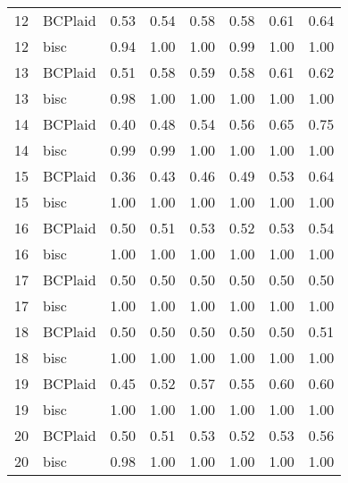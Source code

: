 \begin{table}[ht]
\begin{tabular}{rlrrrrrr}
   12 & BCPlaid & 0.53 & 0.54 & 0.58 & 0.58 & 0.61 & 0.64 \\ 
   12 & bisc & 0.94 & 1.00 & 1.00 & 0.99 & 1.00 & 1.00 \\ 
   13 & BCPlaid & 0.51 & 0.58 & 0.59 & 0.58 & 0.61 & 0.62 \\ 
   13 & bisc & 0.98 & 1.00 & 1.00 & 1.00 & 1.00 & 1.00 \\ 
   14 & BCPlaid & 0.40 & 0.48 & 0.54 & 0.56 & 0.65 & 0.75 \\ 
   14 & bisc & 0.99 & 0.99 & 1.00 & 1.00 & 1.00 & 1.00 \\ 
   15 & BCPlaid & 0.36 & 0.43 & 0.46 & 0.49 & 0.53 & 0.64 \\ 
   15 & bisc & 1.00 & 1.00 & 1.00 & 1.00 & 1.00 & 1.00 \\ 
   16 & BCPlaid & 0.50 & 0.51 & 0.53 & 0.52 & 0.53 & 0.54 \\ 
   16 & bisc & 1.00 & 1.00 & 1.00 & 1.00 & 1.00 & 1.00 \\ 
   17 & BCPlaid & 0.50 & 0.50 & 0.50 & 0.50 & 0.50 & 0.50 \\ 
   17 & bisc & 1.00 & 1.00 & 1.00 & 1.00 & 1.00 & 1.00 \\ 
   18 & BCPlaid & 0.50 & 0.50 & 0.50 & 0.50 & 0.50 & 0.51 \\ 
   18 & bisc & 1.00 & 1.00 & 1.00 & 1.00 & 1.00 & 1.00 \\ 
   19 & BCPlaid & 0.45 & 0.52 & 0.57 & 0.55 & 0.60 & 0.60 \\ 
   19 & bisc & 1.00 & 1.00 & 1.00 & 1.00 & 1.00 & 1.00 \\ 
   20 & BCPlaid & 0.50 & 0.51 & 0.53 & 0.52 & 0.53 & 0.56 \\ 
   20 & bisc & 0.98 & 1.00 & 1.00 & 1.00 & 1.00 & 1.00 \\ 
   \bottomrule
\end{tabular}
\end{table}
